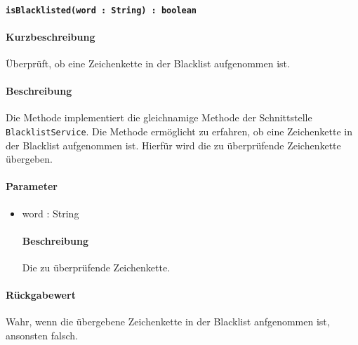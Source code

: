 \paragraph{\texttt{isBlacklisted(word : String) : boolean}}%
\paragraph*{Kurzbeschreibung}
Überprüft, ob eine Zeichenkette in der Blacklist aufgenommen ist.
\paragraph*{Beschreibung}
Die Methode implementiert die gleichnamige Methode der Schnittstelle \texttt{BlacklistService}.
Die Methode ermöglicht zu erfahren, ob eine Zeichenkette in der Blacklist aufgenommen ist.
Hierfür wird die zu überprüfende Zeichenkette übergeben.
\paragraph*{Parameter}
\begin{itemize}
    \item word : String
    		\paragraph*{Beschreibung}
    		Die zu überprüfende Zeichenkette.
\end{itemize}
\paragraph*{Rückgabewert}
Wahr, wenn die übergebene Zeichenkette in der Blacklist anfgenommen ist, ansonsten falsch.
